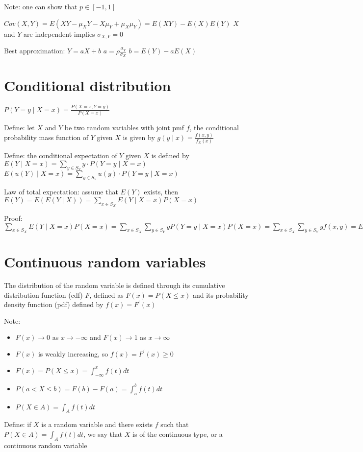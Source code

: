 \documentclass{article}
\begin{document}
Note: one can show that $p\in[-1,1]$

$Cov(X,Y)=E(XY-\mu_XY-X\mu_Y+\mu_X\mu_Y)=E(XY)-E(X)E(Y)$
$X$ and $Y$ are independent implies $\sigma_{X,Y}=0$

Best approximation: $Y=aX+b$
$a=\rho\frac{\sigma_Y}{\sigma_X}$
$b=E(Y)-aE(X)$

\section{Conditional distribution}

$P(Y=y\mid X=x)=\frac{P(X=x,Y=y)}{P(X=x)}$

Define: let $X$ and $Y$ be two random variables with joint pmf $f$, the conditional probability mass function of $Y$ given $X$ is given by $g(y\mid x)=\frac{f(x,y)}{f_X(x)}$

Define: the conditional expectation of $Y$ given $X$ is defined by $E(Y\mid X=x)=\sum_{y\in S_Y}y\cdot P(Y=y\mid X=x)$
$E(u(Y)\mid X=x)=\sum_{y\in S_Y}u(y)\cdot P(Y=y\mid X=x)$

Law of total expectation: assume that $E(Y)$ exists, then $E(Y)=E(E(Y\mid X))=\sum_{x\in S_X}E(Y\mid X=x)P(X=x)$

Proof: $\sum_{x\in S_X}E(Y\mid X=x)P(X=x)=\sum_{x\in S_X}\sum_{y\in S_Y}yP(Y=y\mid X=x)P(X=x)=\sum_{x\in S_X}\sum_{y\in S_Y}yf(x,y)=E(Y)$

\section{Continuous random variables}

The distribution of the random variable is defined through its cumulative distribution function (cdf) $F$, defined as $F(x)=P(X\le x)$ and its probability density function (pdf) defined by $f(x)=F^\prime(x)$

Note:
\begin{itemize}
    \item $F(x)\to0$ as $x\to-\infty$ and $F(x)\to1$ as $x\to\infty$
    \item $F(x)$ is weakly increasing, so $f(x)=F^\prime(x)\ge0$
    \item $F(x)=P(X\le x)=\int_{-\infty}^xf(t)dt$
    \item $P(a<X\le b)=F(b)-F(a)=\int_a^bf(t)dt$
    \item $P(X\in A)=\int_Af(t)dt$
\end{itemize}

Define: if $X$ is a random variable and there exists $f$ such that $P(X\in A)=\int_Af(t)dt$, we say that $X$ is of the continuous type, or a continuous random variable
\end{document}
